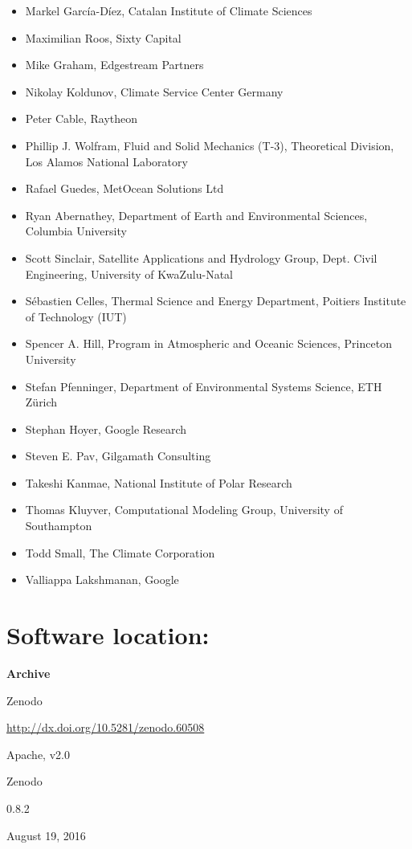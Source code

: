 \documentclass{jors}
\begin{document}
\begin{itemize}
\item Markel García-Díez, Catalan Institute of Climate Sciences
\item Maximilian Roos, Sixty Capital
\item Mike Graham, Edgestream Partners
\item Nikolay Koldunov, Climate Service Center Germany
\item Peter Cable, Raytheon
\item Phillip J. Wolfram, Fluid and Solid Mechanics (T-3), Theoretical Division, Los Alamos National Laboratory
\item Rafael Guedes, MetOcean Solutions Ltd
\item Ryan Abernathey, Department of Earth and Environmental Sciences, Columbia University
\item Scott Sinclair, Satellite Applications and Hydrology Group, Dept. Civil Engineering, University of KwaZulu-Natal
\item S\'ebastien Celles, Thermal Science and Energy Department, Poitiers Institute of Technology (IUT)
\item Spencer A. Hill, Program in Atmospheric and Oceanic Sciences, Princeton University
\item Stefan Pfenninger, Department of Environmental Systems Science, ETH Zürich
\item Stephan Hoyer, Google Research
\item Steven E. Pav, Gilgamath Consulting
\item Takeshi Kanmae, National Institute of Polar Research
\item Thomas Kluyver, Computational Modeling Group, University of Southampton
\item Todd Small, The Climate Corporation
\item Valliappa Lakshmanan, Google
\end{itemize}

\section*{Software location:}

{\bf Archive}

\begin{description}[noitemsep,topsep=0pt]
	\item[Name:] Zenodo
	\item[Persistent identifier:] \url{http://dx.doi.org/10.5281/zenodo.60508}
	\item[Licence:] Apache, v2.0
	\item[Publisher:]  Zenodo
	\item[Version published:] 0.8.2
	\item[Date published:] August 19, 2016
\end{description}
\end{document}
